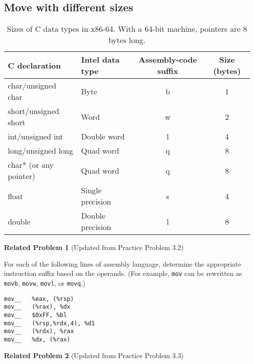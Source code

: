 \documentclass{article}
\begin{document}
\subsection{Move with different sizes}
\begin{table}[h]
    \centering
    \small
    \renewcommand{\arraystretch}{1.2}
    \begin{tabular}{l l c c}
        \toprule
        \textbf{C declaration} & \textbf{Intel data type} & \textbf{Assembly-code suffix} & \textbf{Size (bytes)} \\
        \midrule
        char/unsigned char     & Byte             & b  & 1 \\
        short/unsigned short    & Word             & w  & 2 \\
        int/unsigned int      & Double word      & l  & 4 \\
        long/unsigned long     & Quad word        & q  & 8 \\
        char* (or any pointer)  & Quad word        & q  & 8 \\
        float    & Single precision & s  & 4 \\
        double   & Double precision & l  & 8 \\
        \bottomrule
    \end{tabular}
    \caption{Sizes of C data types in x86-64. With a 64-bit machine, pointers are 8 bytes long.}
    \label{tab:c_data_types}
\end{table}


\noindent\textbf{Related Problem 1} (Updated from Practice Problem 3.2)

\vspace{5pt}

For each of the following lines of assembly language, determine the appropriate instruction suffix based on the operands. (For example, \texttt{mov} can be rewritten as \texttt{movb}, \texttt{movw}, \texttt{movl}, or \texttt{movq}.)

\vspace{10pt}

\begin{lstlisting}[basicstyle=\ttfamily, frame=none]
mov__   %eax, (%rsp)        
mov__   (%rax), %dx         
mov__   $0xFF, %bl          
mov__   (%rsp,%rdx,4), %d1  
mov__   (%rdx), %rax        
mov__   %dx, (%rax)        
\end{lstlisting}

\noindent\textbf{Related Problem 2} (Updated from Practice Problem 3.3)
\end{document}
